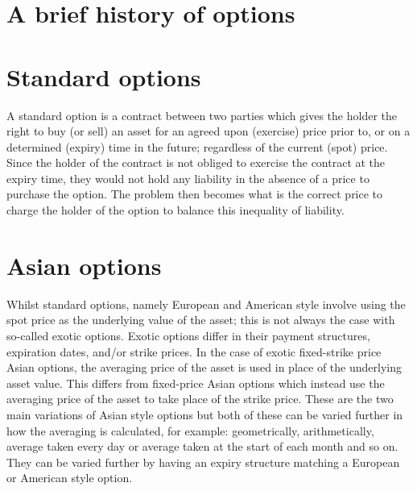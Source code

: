\section{A brief history of options}



\section{Standard options}

A standard option is a contract between two parties which gives the holder the right to buy (or sell) an asset for an agreed upon (exercise) price prior to, or on a determined (expiry) time in the future; regardless of the current (spot) price. Since the holder of the contract is not obliged to exercise the contract at the expiry time, they would not hold any liability in the absence of a price to purchase the option. The problem then becomes what is the correct price to charge the holder of the option to balance this inequality of liability. 

\section{Asian options}

Whilst standard options, namely European and American style involve using the spot price as the underlying value of the asset; this is not always the case with so-called exotic options. Exotic options differ in their payment structures, expiration dates, and/or strike prices. In the case of exotic fixed-strike price Asian options, the averaging price of the asset is used in place of the underlying asset value. This differs from fixed-price Asian options which instead use the averaging price of the asset to take place of the strike price. These are the two main variations of Asian style options but both of these can be varied further in how the averaging is calculated, for example: geometrically, arithmetically, average taken every day or average taken at the start of each month and so on. They can be varied further by having an expiry structure matching a European or American style option.